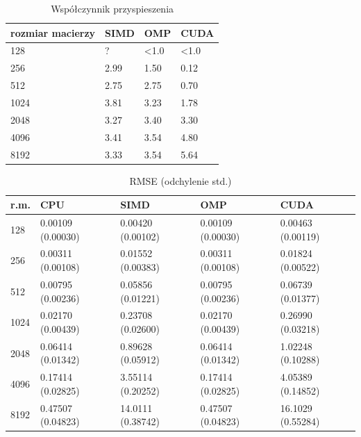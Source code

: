 \documentclass[11pt,a4paper]{article}
\begin{document}
\begin{table}[h!]
\begin{center}
\begin{tabular}{llll}
\toprule
rozmiar macierzy & SIMD & OMP & CUDA \\
\midrule
128 & ? & \textless 1.0 & \textless 1.0 \\
256 & 2.99 & 1.50 & 0.12 \\
512 & 2.75 & 2.75 & 0.70 \\
1024 & 3.81 & 3.23 & 1.78 \\
2048 & 3.27 & 3.40 & 3.30 \\
4096 & 3.41 & 3.54 & 4.80 \\
8192 & 3.33 & 3.54 & 5.64 \\
\bottomrule
\end{tabular}
\caption{Współczynnik przyspieszenia}
\end{center}
\end{table}

\begin{table}[h!]
\begin{center}
\begin{tabular}{lllll}
\toprule
r.m. & CPU & SIMD & OMP & CUDA \\
\midrule
128 &  0.00109 (0.00030) &  0.00420 (0.00102) &  0.00109 (0.00030) &  0.00463 (0.00119) \\
256 &  0.00311 (0.00108) &  0.01552 (0.00383) &  0.00311 (0.00108) &  0.01824 (0.00522) \\
512 &  0.00795 (0.00236) &  0.05856 (0.01221) &  0.00795 (0.00236) &  0.06739 (0.01377) \\
1024 &  0.02170 (0.00439) &  0.23708 (0.02600) &  0.02170 (0.00439) &  0.26990 (0.03218) \\
2048 &  0.06414 (0.01342) &  0.89628 (0.05912) &  0.06414 (0.01342) &  1.02248 (0.10288) \\
4096 &  0.17414 (0.02825) &  3.55114 (0.20252) &  0.17414 (0.02825) &  4.05389 (0.14852) \\
8192 &  0.47507 (0.04823) &  14.0111 (0.38742) &  0.47507 (0.04823) &  16.1029 (0.55284) \\
\bottomrule
\end{tabular}
\caption{RMSE (odchylenie std.)}
\end{center}
\end{table}
\end{document}
